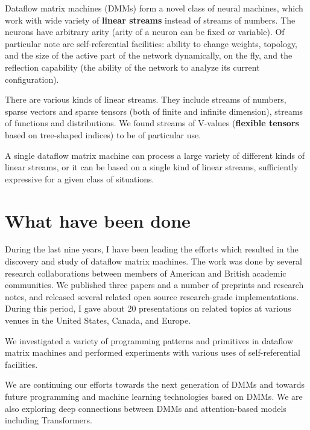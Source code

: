 \documentclass{article}
\begin{document}
\vspace{0.1in}
\noindent
Dataflow matrix machines (DMMs) form a novel class of neural machines, which work with wide variety
of {\bf linear streams} instead of streams of numbers. The neurons have
arbitrary arity (arity of a neuron can be fixed or variable). Of particular note are
self-referential facilities: ability to change weights, topology, and the size of the active part of the network dynamically, on the fly,
and the reflection capability (the ability of the network to analyze its current configuration).

\vspace{0.1in}
\noindent
There are various kinds of linear streams. They include streams of numbers, sparse vectors and sparse tensors (both of
finite and infinite dimension), streams of functions and distributions. We found streams of V-values
({\bf flexible tensors} based on tree-shaped indices) to be of particular use.

\vspace{0.1in}
\noindent
A single dataflow matrix machine can process a large variety of different kinds of linear streams, or
it can be based on a single kind of linear streams, sufficiently expressive for a given class of situations.

\section{What have been done}

During the last nine years, I have been leading the efforts which resulted in
the discovery and study of dataflow matrix machines. The work was done by
several research collaborations between members of American and British 
academic communities. We published three papers and a number of preprints and
research notes, and released several related open source research-grade
implementations. During this period, I gave about 20 presentations on 
related topics at various venues in the United States, Canada, and Europe.

\vspace{0.1in}
\noindent
We investigated a variety of programming patterns and primitives in
dataflow matrix machines and performed experiments with various uses of self-referential
facilities.

\vspace{0.1in}
\noindent
We are continuing our efforts towards the next generation of DMMs 
and towards future programming and machine learning
technologies based on DMMs. We are also exploring 
deep connections between DMMs and attention-based models including Transformers.
\end{document}
